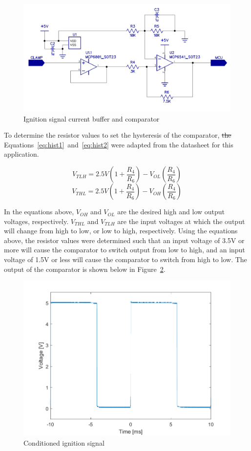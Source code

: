 \documentclass[11pt]{article}
\providecommand{\DIFdeltex}[1]{{\protect\color{red}\sout{#1}}}                      %
\providecommand{\DIFdelbegin}{} %
\providecommand{\DIFdelend}{} %
\providecommand{\DIFdel}[1]{\texorpdfstring{\DIFdeltex{#1}}{}} %
\newcommand{\DIFscaledelfig}{0.5}
\newlength{\DIFdelgraphicswidth} %
\newlength{\DIFdelgraphicsheight} %
\newcommand{\DIFdelincludegraphics}[2][]{%
\sbox{\DIFdelgraphicsbox}{\DIFOincludegraphics[#1]{#2}}%
\settoboxwidth{\DIFdelgraphicswidth}{\DIFdelgraphicsbox} %
\settoboxtotalheight{\DIFdelgraphicsheight}{\DIFdelgraphicsbox} %
\scalebox{\DIFscaledelfig}{%
\parbox[b]{\DIFdelgraphicswidth}{\usebox{\DIFdelgraphicsbox}\\[-\baselineskip] \rule{\DIFdelgraphicswidth}{0em}}\llap{\resizebox{\DIFdelgraphicswidth}{\DIFdelgraphicsheight}{%
\setlength{\unitlength}{\DIFdelgraphicswidth}%
\begin{picture}(1,1)%
\thicklines\linethickness{2pt} %
{\color[rgb]{1,0,0}\put(0,0){\framebox(1,1){}}}%
{\color[rgb]{1,0,0}\put(0,0){\line( 1,1){1}}}%
{\color[rgb]{1,0,0}\put(0,1){\line(1,-1){1}}}%
\end{picture}%
}\hspace*{3pt}}} %
} %
\DeclareRobustCommand{\DIFdelbegin}{\DIFOdelbegin \let\includegraphics\DIFdelincludegraphics} %
\DeclareRobustCommand{\DIFdelend}{\DIFOaddend \let\includegraphics\DIFOincludegraphics} %
\begin{document}
\begin{figure}[H]
    \centering
    \includegraphics[width=.9\textwidth]{comp}
    \caption{Ignition signal current buffer and comparator}
    \label{fig:comp}
\end{figure}

To determine the resistor values to set the hysteresis of the comparator,  \DIFdelbegin \DIFdel{the }\DIFdelend Equations~\ref{eq:hist1}~and~\ref{eq:hist2} were adapted from the datasheet\cite{mcp6541} for this application.

\begin{equation}
\label{eq:hist1}
    V_{TLH} = 2.5V(1+\frac{R_4}{R_6}) - V_{OL}(\frac{R_4}{R_6})
\end{equation}
\begin{equation}
\label{eq:hist2}
    V_{THL} = 2.5V(1+\frac{R_4}{R_6}) - V_{OH}(\frac{R_4}{R_6})
\end{equation}

In the equations above, $V_{OH}$ and $V_{OL}$ are the desired high and low output voltages, respectively. $V_{THL}$ and $V_{TLH}$ are the input voltages at which the output will change from high to low, or low to high, respectively. Using the equations above, the resistor values were determined such that an input voltage of 3.5V or more will cause the comparator to switch output from low to high, and an input voltage of 1.5V or less will cause the comparator to switch from high to low. The output of the comparator is shown below in Figure~\ref{fig:conditioned}.

\begin{figure}[H]
    \centering
    \includegraphics[width=.7\textwidth]{conditioned}
    \caption{Conditioned ignition signal}
    \label{fig:conditioned}
\end{figure}
\end{document}
